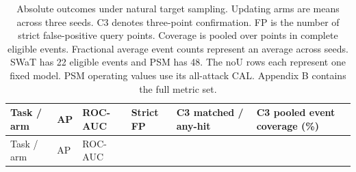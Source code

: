 \documentclass[pdflatex,sn-apa]{sn-jnl}
\begin{document}
\begin{longtable}[]{@{}
  >{\raggedright\arraybackslash}p{}
  >{\raggedleft\arraybackslash}p{}
  >{\raggedleft\arraybackslash}p{}
  >{\raggedleft\arraybackslash}p{}
  >{\raggedleft\arraybackslash}p{}
  >{\raggedleft\arraybackslash}p{}@{}}
\caption{Absolute outcomes under natural target sampling. Updating arms
are means across three seeds. C3 denotes three-point confirmation. FP is
the number of strict false-positive query points. Coverage is pooled
over points in complete eligible events. Fractional average event counts
represent an average across seeds. SWaT has 22 eligible events and PSM
has 48. The noU rows each represent one fixed model. PSM operating
values use its all-attack CAL. Appendix B contains the full metric
set.}\tabularnewline
\toprule\noalign{}
\begin{minipage}[b]{\linewidth}\raggedright
Task / arm
\end{minipage} & \begin{minipage}[b]{\linewidth}\raggedleft
AP
\end{minipage} & \begin{minipage}[b]{\linewidth}\raggedleft
ROC-AUC
\end{minipage} & \begin{minipage}[b]{\linewidth}\raggedleft
Strict FP
\end{minipage} & \begin{minipage}[b]{\linewidth}\raggedleft
C3 matched / any-hit
\end{minipage} & \begin{minipage}[b]{\linewidth}\raggedleft
C3 pooled event coverage (\%)
\end{minipage} \\
\midrule\noalign{}
\endfirsthead
\toprule\noalign{}
\begin{minipage}[b]{\linewidth}\raggedright
Task / arm
\end{minipage} & \begin{minipage}[b]{\linewidth}\raggedleft
AP
\end{minipage} & \begin{minipage}[b]{\linewidth}\raggedleft
ROC-AUC
\end{minipage} & \begin{minipage}[b]{\linewidth}\raggedleft

\end{minipage}
\end{longtable}
\end{document}
